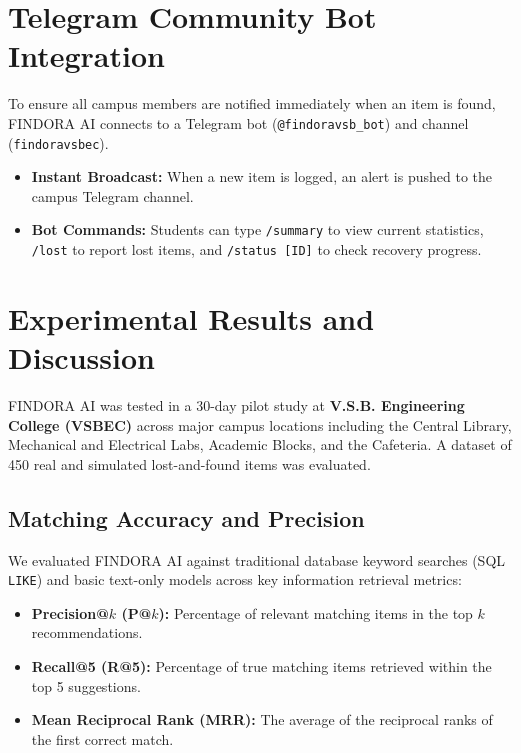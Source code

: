 \documentclass[conference]{IEEEtran}
\begin{document}
\section{Telegram Community Bot Integration}
To ensure all campus members are notified immediately when an item is found, FINDORA AI connects to a Telegram bot (\texttt{@findoravsb\_bot}) and channel (\texttt{findoravsbec}).
\begin{itemize}
    \item \textbf{Instant Broadcast:} When a new item is logged, an alert is pushed to the campus Telegram channel.
    \item \textbf{Bot Commands:} Students can type \texttt{/summary} to view current statistics, \texttt{/lost} to report lost items, and \texttt{/status [ID]} to check recovery progress.
\end{itemize}

\section{Experimental Results and Discussion}
FINDORA AI was tested in a 30-day pilot study at \textbf{V.S.B. Engineering College (VSBEC)} across major campus locations including the Central Library, Mechanical and Electrical Labs, Academic Blocks, and the Cafeteria. A dataset of 450 real and simulated lost-and-found items was evaluated.

\subsection{Matching Accuracy and Precision}
We evaluated FINDORA AI against traditional database keyword searches (SQL \texttt{LIKE}) and basic text-only models across key information retrieval metrics:
\begin{itemize}
    \item \textbf{Precision@$k$ (P@$k$):} Percentage of relevant matching items in the top $k$ recommendations.
    \item \textbf{Recall@5 (R@5):} Percentage of true matching items retrieved within the top 5 suggestions.
    \item \textbf{Mean Reciprocal Rank (MRR):} The average of the reciprocal ranks of the first correct match.
\end{itemize}
\end{document}
